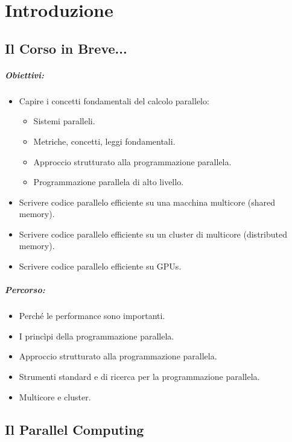 \chapter{Introduzione}

\section{Il Corso in Breve...}

\paragraph{Obiettivi:}

\begin{itemize}
\item Capire i concetti fondamentali del calcolo parallelo:
\begin{itemize}
  \item Sistemi paralleli. 
  \item Metriche, concetti, leggi fondamentali. 
  \item Approccio strutturato alla programmazione parallela. 
  \item Programmazione parallela di alto livello.
\end{itemize}
\item Scrivere codice parallelo efficiente su una macchina multicore (shared memory). 
\item Scrivere codice parallelo efficiente su un cluster di multicore (distributed memory). 
\item Scrivere codice parallelo efficiente su GPUs.
\end{itemize}

\paragraph{Percorso:}

\begin{itemize}
  \item Perché le performance sono importanti. 
  \item I princìpi della programmazione parallela.
  \item Approccio strutturato alla programmazione parallela. 
  \item Strumenti standard e di ricerca per la programmazione parallela. 
  \item Multicore e cluster.
\end{itemize}

\section{Il Parallel Computing}


